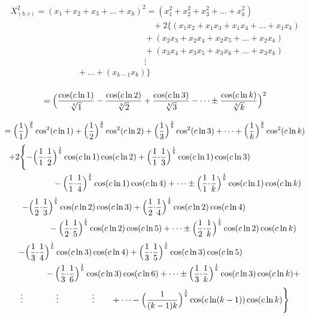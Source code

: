 \documentclass{amsart}
\begin{document}
	
	\[ \begin{array}{c}
		X_{(b,c)}^2 = (x_1 + x_2 + x_3 + \dots + x_k)^2 = (x_1^2 + x_2^2 + x_3^2 + \dots + x_k^2) \\
		\qquad\qquad\qquad\qquad\qquad\qquad\qquad\qquad\quad + 2\{(x_1x_2 + x_1x_3 + x_1x_4 + \dots + x_{1}x_{k}) \\ 
		\qquad\qquad\qquad\qquad\qquad\qquad\qquad\qquad + (x_2x_3 + x_2x_4 + x_2x_5 + \dots + x_2x_{k}) \\ 
		\qquad\qquad\qquad\qquad\qquad\qquad\qquad\qquad + (x_3x_4 + x_3x_5 + x_3x_6 + \dots + x_3x_{k}) \\ 
		\qquad\qquad\qquad\qquad\qquad\qquad\qquad\qquad \vdots \\
		\qquad\qquad\qquad\qquad + \dots + (x_{k-1}x_{k}) \} \\ 
	\end{array} \]
	\[\]
	
	\[ = \Bigl( \frac{\cos({c\ln 1})}{\sqrt[b]{1}} - \frac{\cos({c\ln 2})}{\sqrt[b]{2}} + \frac{\cos({c\ln 3})}{\sqrt[b]{3}} - \dots \pm \frac{\cos({c\ln k})}{\sqrt[b]{k}} \Bigr)^2 \]
	\[\]
	\[ = \Bigl( \frac{1}{1} \Bigr)^{\frac2b}\cos^2({c \ln 1}) + \Bigl( \frac{1}{2} \Bigr)^{\frac2b}\cos^2({c \ln 2}) + \Bigl( \frac{1}{3} \Bigr)^{\frac2b}\cos^2({c \ln 3}) + \dots + \Bigl( \frac{1}{k} \Bigr)^{\frac2b}\cos^2({c \ln k}) \]
	\[
	\begin{aligned}
		+2\Biggl\{ -\Bigl( \frac{1}{1} {\cdot} \frac{1}{2}& \Bigr)^\frac1b \cos(c \ln1) \cos(c \ln2) + \Bigl( \frac{1}{1} {\cdot} \frac{1}{3} \Bigr)^\frac1b \cos(c \ln 1) \cos(c \ln 3) \\ 
		& - \Bigl( \frac{1}{1} {\cdot} \frac{1}{4} \Bigr)^\frac1b \cos(c \ln 1) \cos(c \ln 4) + \dots \pm \Bigl( \frac{1}{1} {\cdot} \frac{1}{k} \Bigr)^\frac1b \cos(c \ln 1) \cos(c \ln k) \\ 		
	\end{aligned}
	\]
	\[
	\begin{aligned}
		\quad - \Bigl( \frac{1}{2} {\cdot} \frac{1}{3}& \Bigr)^\frac1b \cos(c \ln2) \cos(c \ln3) + \Bigl( \frac{1}{2} {\cdot} \frac{1}{4} \Bigr)^\frac1b \cos(c \ln 2) \cos(c \ln 4) \\ 
		& - \Bigl( \frac{1}{2} {\cdot} \frac{1}{5} \Bigr)^\frac1b \cos(c \ln 2) \cos(c \ln 5) + \dots \pm \Bigl( \frac{1}{2} {\cdot} \frac{1}{k} \Bigr)^\frac1b \cos(c \ln 2) \cos(c \ln k) \\ 		
	\end{aligned}
	\]
	\[
	\begin{aligned}
		\quad - \Bigl( \frac{1}{3} {\cdot} \frac{1}{4}& \Bigr)^\frac1b \cos(c \ln3) \cos(c \ln4) + \Bigl( \frac{1}{3} {\cdot} \frac{1}{5} \Bigr)^\frac1b \cos(c \ln 3) \cos(c \ln 5) \\ 
		& - \Bigl( \frac{1}{3} {\cdot} \frac{1}{6} \Bigr)^\frac1b \cos(c \ln 3) \cos(c \ln 6) + \dots \pm \Bigl( \frac{1}{3} {\cdot} \frac{1}{k} \Bigr)^\frac1b \cos(c \ln 3) \cos(c \ln k) + \\ 		
	\end{aligned}
	\]
	\[
	\begin{aligned}
		\vdots \qquad\qquad \vdots \qquad\qquad \vdots \qquad + \dots - \Bigl( \frac{1}{(k-1)k} \Bigr)^\frac1b \cos(c \ln (k-1)) \cos(c \ln k) \Biggr\}
	\end{aligned}
	\]
	\[\]
	
\end{document}
